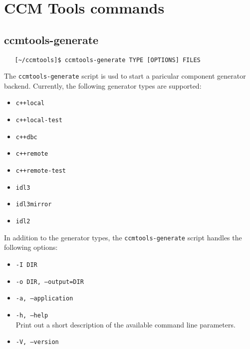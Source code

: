 \chapter{CCM Tools commands}

\section{ccmtools-generate}


\begin{verbatim}
   [~/ccmtools]$ ccmtools-generate TYPE [OPTIONS] FILES
\end{verbatim}


The {\tt ccmtools-generate} script is usd to start a paricular component generator 
backend. 
Currently, the following generator types are supported:
\begin{itemize}
\item {\tt c++local} \\

\item {\tt c++local-test} \\

\item {\tt c++dbc} \\

\item {\tt c++remote} \\

\item {\tt c++remote-test} \\

\item {\tt idl3 } \\

\item {\tt idl3mirror } \\

\item {\tt idl2}
\end{itemize}

In addition to the generator types, the {\tt ccmtools-generate} script handles
the following options:

\begin{itemize}
\item {\tt -I DIR} \\

\item {\tt -o DIR, --output=DIR} \\

\item {\tt -a, --application} \\

\item {\tt -h, --help} \\
Print out a short description of the available command line parameters.

\item {\tt -V, --version} \\
\end{itemize}
